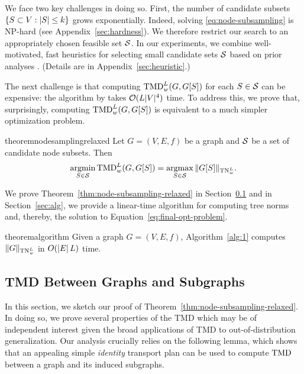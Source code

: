 We face {two} key challenges in doing so. First, the number of candidate subsets $\{S \subset V: \left\lvert S\right\rvert \leq {k}\}$ grows exponentially.  Indeed, solving \eqref{eq:node-subsampling} is NP-hard (see Appendix~\ref{sec:hardness}).
 We therefore 
 restrict
 our search to an appropriately chosen feasible set $\mathcal S$.
In our experiments, we combine well-motivated, fast heuristics for selecting small candidate sets $\mathcal S$ based on prior analyses \citep{salha2022degeneracy, razin2023ability, alimohammadi2023local}. (Details are in Appendix~\ref{sec:heuristic}.)

The next challenge is that computing $\textnormal{TMD}_w^L(G, G[S])$ for each $S \in \mathcal S$ can be expensive: the algorithm by \citet{Chuang22:Tree} takes $\mathcal O(L|V|^4)$ time. To address this, we prove that, surprisingly, computing $\textnormal{TMD}_w^L(G, G[S])$ is equivalent to a much simpler optimization problem. 

\begin{restatable}{theorem}{nodesamplingrelaxed}\label{thm:node-subsampling-relaxed} Let $G = (V, E, f)$ be a graph and $\mathcal S$ be a set of candidate node subsets. Then \begin{align}\label{eq:final-opt-problem}
    \operatorname*{argmin}_{S \in \mathcal S} \textnormal{TMD}_w^L(G, G[S]) = \operatorname*{argmax}_{S \in \mathcal S} \Vert G[S] \Vert_{\textnormal{TN}_w^L}.
\end{align}
\end{restatable}

We prove Theorem~\ref{thm:node-subsampling-relaxed} in Section~\ref{sec:proof} and in Section~\ref{sec:alg}, we provide a linear-time algorithm for computing tree norms and, thereby, the solution to Equation~\eqref{eq:final-opt-problem}.

\begin{restatable}{theorem}{algorithm}\label{thm:node-subsampling-relaxed-algorithm} Given a graph $G = (V, E, f)$, Algorithm~\ref{alg:1} computes $\Vert G \Vert_{\textnormal{TN}_w^L}$ in $O(\left\lvert E\right\rvert L)$ time.
\end{restatable}

\subsection{TMD Between Graphs and Subgraphs}\label{sec:proof}

In this section, we sketch our proof of Theorem~\ref{thm:node-subsampling-relaxed}. In doing so, we prove several properties of the TMD which may be of independent interest given the broad applications of TMD to out-of-distribution generalization. Our analysis crucially relies on the following lemma, which shows that an appealing simple \emph{identity} transport plan can be used to compute $\textnormal{TMD}$ between a graph and its induced subgraphs.

